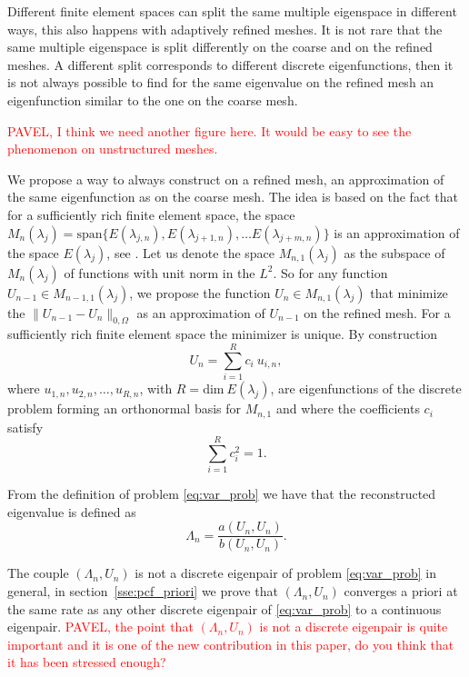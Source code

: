 \documentclass[preprint,12pt]{elsarticle}
\begin{document}
Different finite element spaces can split the same multiple eigenspace in different ways, this also happens with adaptively refined meshes. It is not rare that the same multiple eigenspace is split differently on the coarse and on the refined meshes. A different split corresponds to different discrete eigenfunctions, then it is not always possible to find for the same eigenvalue on the refined mesh an eigenfunction similar to the one on the coarse mesh.

\textcolor{red}{PAVEL, I think we need another figure here. It would be easy to see the phenomenon on unstructured meshes.}

We propose a way to always construct on a refined mesh, an approximation of the same eigenfunction as on the coarse mesh. The idea is based on the fact that for a sufficiently rich finite element space, the space $M_n(\lambda_j)=\mathrm{span}\{E(\lambda_{j,n}),E(\lambda_{j+1,n}),\dots E(\lambda_{j+m,n})\}$ is an approximation of the space $E(\lambda_j)$, see \cite{strang}. Let us denote the space $M_{n,1}(\lambda_j)$ as the subspace of $M_n(\lambda_j)$ of functions with unit norm in the $L^2$.
So for any function $U_{n-1}\in M_{n-1,1}(\lambda_j)$, we propose the function $U_{n}\in M_{n,1}(\lambda_j)$ that minimize the $\|U_{n-1}-U_{n}\|_{0,\Omega}$ as an approximation of $U_{n-1}$ on the refined mesh. For a sufficiently rich finite element space the minimizer is unique. By construction
\begin{equation}\label{eq:const}
U_n=\sum_{i=1}^{R} c_i \ u_{i,n},
\end{equation}
where $u_{1,n},u_{2,n},\dots,u_{R,n}$, with $R=\mathrm{dim}\ E(\lambda_j)$, are eigenfunctions of the discrete problem forming  an orthonormal basis for
$M_{n,1}$ and where the coefficients $c_i$ satisfy 
\begin{equation}\label{eq:cond_on_corf}
\sum_{i=1}^{R} c_i^2=1.
\end{equation}

From the definition of problem \eqref{eq:var_prob} we have that the reconstructed eigenvalue is defined as
$$
\Lambda_n=\frac{a(U_n,U_n)}{b(U_n,U_n)}.
$$

The couple $(\Lambda_n,U_n)$ is not a discrete eigenpair of problem \eqref{eq:var_prob} in general, in section~\ref{sse:pcf_priori} we prove that $(\Lambda_n,U_n)$ converges a priori at the same rate as any other discrete eigenpair of \eqref{eq:var_prob} to a continuous eigenpair.
\textcolor{red}{PAVEL, the point that $(\Lambda_n,U_n)$ is not a discrete eigenpair is quite important and it is one of the new contribution in this paper, do you think that it has been stressed enough?}
\end{document}

